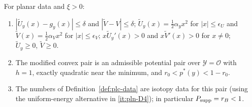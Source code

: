 \begin{lemma}\label{lem:plc-data}
For planar data and $\xi>0$:
\begin{enumerate}[label=(\alph*)]
\item $|\widetilde U_y(x)-g_y(x)|\le\delta$ and $|\widetilde V-V|\le\delta$; $\widetilde U_y(x)=\frac12\alpha_yx^2$ for
 $|x|\le\epsilon_U$ and $\widetilde V(x)=\frac12\alpha_Vx^2$ for $|x|\le\epsilon_V$; $x\widetilde U_y'(x)>0$ and
 $x\widetilde V'(x)>0$ for $x\ne0$; $\widetilde U_y\ge0$, $\widetilde V\ge0$.
\item The modified convex pair is an admissible potential pair over $\mathcal Y=\mathcal O$ with $h=1$, exactly
 quadratic near the minimum, and $r_0<p^*(y)<1-r_0$.
\item The numbers of Definition~\ref{def:plc-data} are isotopy data for this pair (using the uniform-energy
 alternative in \ref{it:pln-D4}); in particular $P_{\rm supp}=r_B<1$.
\end{enumerate}
\end{lemma}

